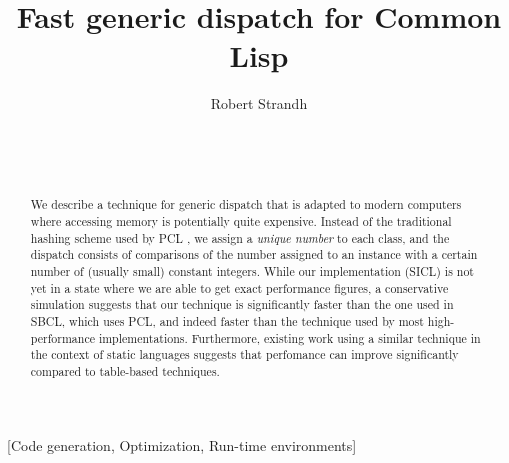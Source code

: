 \documentclass{acm_proc_article-sp}
\def\inputtex#1{}
\begin{document}
\title{Fast generic dispatch for Common Lisp}
\author{\alignauthor
Robert Strandh\\
\\
\\
\\
}


\maketitle

\begin{abstract}
We describe a technique for generic dispatch that is adapted to modern
computers where accessing memory is potentially quite expensive.
Instead of the traditional hashing scheme used by PCL
\cite{Kiczales:1990:EMD:91556.91600}, we assign a \emph{unique number}
to each class, and the dispatch consists of comparisons of the number
assigned to an instance with a certain number of (usually small)
constant integers.  While our implementation (SICL) is not yet in a
state where we are able to get exact performance figures, a
conservative simulation suggests that our technique is significantly
faster than the one used in SBCL, which uses PCL, and indeed faster
than the technique used by most high-performance \cl{}
implementations.  Furthermore, existing work
\cite{Zendra:1997:EDD:263698.263728} using a similar technique in the
context of static languages suggests that perfomance can improve
significantly compared to table-based techniques.
\end{abstract}

[Code generation, Optimization, Run-time environments]



\inputtex{sec-introduction.tex}
\inputtex{sec-previous.tex}
\inputtex{sec-our-method.tex}
\inputtex{sec-performance.tex}
\inputtex{sec-conclusions.tex}
\inputtex{sec-acknowledgements.tex}



\end{document}
